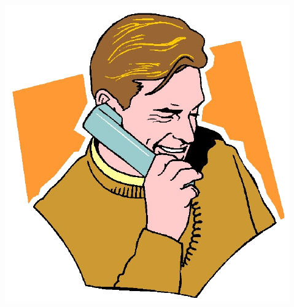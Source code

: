 \begin{frame}
\begin{columns}
\begin{column}[c]{0.34\linewidth}
		\end{column}
		\begin{column}{0.33\linewidth}
			\begin{flushright}
				\includegraphics[scale=0.85]{figures/BOB.png}
			\end{flushright}
		\end{column}
	\end{columns}
\end{frame}
\begin{frame}
\end{frame}

